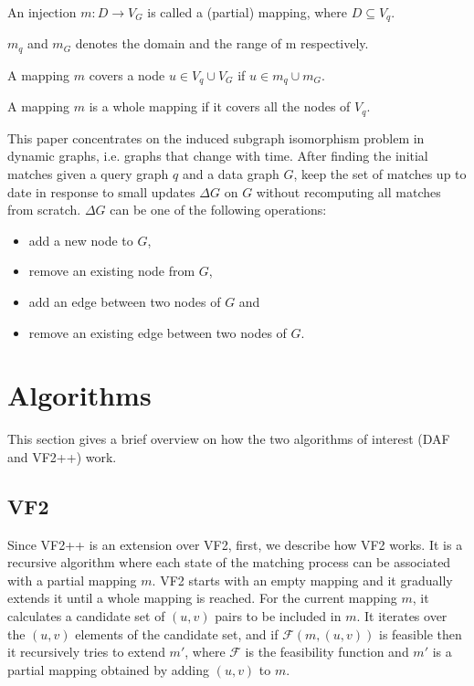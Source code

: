 \begin{definition}
    An injection $m : D \rightarrow V_G$ is called a (partial) mapping, where $D \subseteq V_q$.
\end{definition}

\begin{definition}
    $m_q$ and $m_G$ denotes the domain and the range of m respectively.
\end{definition}

\begin{definition}
    A mapping $m$ covers a node $u \in V_q \cup V_G$ if $u \in m_q \cup m_G$.
\end{definition}

\begin{definition}
    A mapping $m$ is a whole mapping if it covers all the nodes of $V_q$.
\end{definition}


This paper concentrates on the induced subgraph isomorphism problem in dynamic graphs, 
i.e. graphs that change with time. After finding the initial matches given a query graph
\(q\) and a data graph \(G\), keep the set of matches up to date in response to small 
updates \(\Delta G \) on \(G\) without recomputing all matches from scratch. \(\Delta G\) 
can be one of the following operations:
\begin{itemize}
    \item add a new node to \(G\),
    \item remove an existing node from \(G\),
    \item add an edge between two nodes of \(G\) and
    \item remove an existing edge between two nodes of \(G\).
\end{itemize}

\section{Algorithms}

This section gives a brief overview on how the two algorithms of interest (DAF and VF2++)
work.

\subsection{VF2}

Since VF2++ is an extension over VF2, first, we describe how VF2 works. It is a recursive 
algorithm where each state of the matching process can be associated with a partial mapping
$m$. VF2 starts with an empty mapping  and it 
gradually extends it until a whole mapping is reached. For the current mapping $m$, it calculates a 
candidate set of $(u, v)$ pairs to be included in $m$. It iterates over the
$(u, v)$ elements of the candidate set, and if $\mathcal{F}(m, (u, v))$ is feasible then it recursively 
tries to extend $m'$, where $\mathcal{F}$ is the feasibility function and $m'$ is a partial mapping
obtained by adding $(u, v)$ to $m$.

